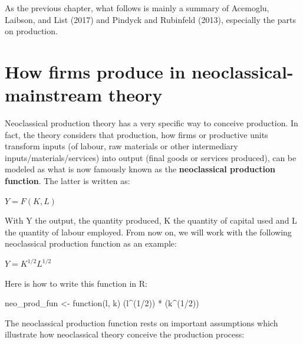 \documentclass[
  letterpaper,
  DIV=11,
  numbers=noendperiod]{scrreprt}
\newenvironment{Shaded}{\begin{snugshade}}{\end{snugshade}}
\newcommand{\ControlFlowTok}[1]{\textcolor[rgb]{0.00,0.23,0.31}{#1}}
\newcommand{\DecValTok}[1]{\textcolor[rgb]{0.68,0.00,0.00}{#1}}
\newcommand{\NormalTok}[1]{\textcolor[rgb]{0.00,0.23,0.31}{#1}}
\newcommand{\OtherTok}[1]{\textcolor[rgb]{0.00,0.23,0.31}{#1}}
\newcommand{\SpecialCharTok}[1]{\textcolor[rgb]{0.37,0.37,0.37}{#1}}
\begin{document}
As the previous chapter, what follows is mainly a summary of Acemoglu,
Laibson, and List (2017) and Pindyck and Rubinfeld (2013), especially
the parts on production.

\hypertarget{how-firms-produce-in-neoclassical-mainstream-theory}{%
\section{How firms produce in neoclassical-mainstream
theory}\label{how-firms-produce-in-neoclassical-mainstream-theory}}

Neoclassical production theory has a very specific way to conceive
production. In fact, the theory considers that production, how firms or
productive units transform inputs (of labour, raw materials or other
intermediary inputs/materials/services) into output (final goods or
services produced), can be modeled as what is now famously known as the
\textbf{neoclassical production function}. The latter is written as:

\(Y = F(K,L)\)

With Y the output, the quantity produced, K the quantity of capital used
and L the quantity of labour employed. From now on, we will work with
the following neoclassical production function as an example:

\(Y = K^{1/2}L^{1/2}\)

Here is how to write this function in R:

\begin{Shaded}
\begin{Highlighting}[]
\NormalTok{neo\_prod\_fun }\OtherTok{\textless{}{-}} \ControlFlowTok{function}\NormalTok{(l, k) (l}\SpecialCharTok{\^{}}\NormalTok{(}\DecValTok{1}\SpecialCharTok{/}\DecValTok{2}\NormalTok{)) }\SpecialCharTok{*}\NormalTok{ (k}\SpecialCharTok{\^{}}\NormalTok{(}\DecValTok{1}\SpecialCharTok{/}\DecValTok{2}\NormalTok{))}
\end{Highlighting}
\end{Shaded}

The neoclassical production function rests on important assumptions
which illustrate how neoclassical theory conceive the production
process:
\end{document}
